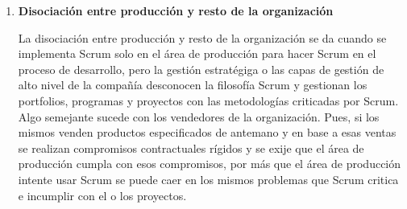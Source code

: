 \begin{enumerate}
\item \textbf{Disociación entre producción y resto de la organización}

La disociación entre producción y resto de la organización se da cuando se implementa Scrum solo en el área de producción para hacer Scrum en el proceso de desarrollo, pero la gestión estratégiga o las capas de gestión de alto nivel de la compañía desconocen la filosofía Scrum y gestionan los portfolios, programas y proyectos con las metodologías criticadas por Scrum. Algo semejante sucede con los vendedores de la organización. Pues, si los mismos venden productos especificados de antemano y en base a esas ventas se realizan compromisos contractuales rígidos y se exije que el área de producción cumpla con esos compromisos, por más que el área de producción intente usar Scrum se puede caer en los mismos problemas que Scrum critica e incumplir con el o los proyectos.


\end{enumerate}
